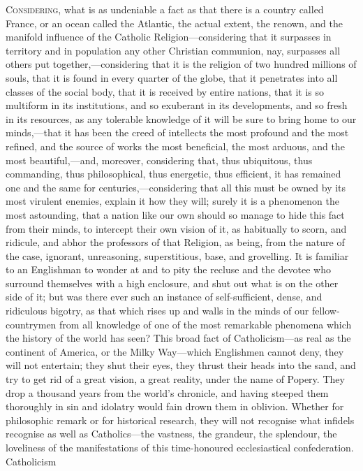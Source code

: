 C\textsc{onsidering}, what is as undeniable a fact as that
there is a country called France, or an ocean called the
Atlantic, the actual extent, the renown, and the manifold
influence of the Catholic Religion—considering that
it surpasses in territory and in population any other
Christian communion, nay, surpasses all others put
together,—considering that it is the religion of two
hundred millions of souls, that it is found in every
quarter of the globe, that it penetrates into all classes
of the social body, that it is received by entire
nations, that it is so multiform in its institutions, and
so exuberant in its developments, and so fresh in its
resources, as any tolerable knowledge of it will be sure
to bring home to our minds,—that it has been the
creed of intellects the most profound and the most
refined, and the source of works the most beneficial, the
most arduous, and the most beautiful,—and, moreover,
considering that, thus ubiquitous, thus commanding, thus
philosophical, thus energetic, thus efficient, it has
remained one and the same for centuries,—considering
that all this must be owned by its most virulent enemies,
explain it how they will; surely it is a phenomenon the
most astounding, that a nation like our own should so
manage to hide this fact from their minds, to intercept
their own vision of it, as habitually to scorn, and
ridicule, and abhor the professors of that Religion, as
being, from the nature of the case, ignorant,
unreasoning, superstitious, base, and grovelling. It is
familiar to an Englishman to wonder at and to pity the
recluse and the devotee who surround themselves with a
high enclosure, and shut out what is on the other side of
it; but was there ever such an instance of
self-sufficient, dense, and ridiculous bigotry, as that
which rises up and walls in the minds of our
fellow-countrymen from all knowledge of one of the most
remarkable phenomena which the history of the world has
seen? This broad fact of Catholicism—as real as the
continent of America, or the Milky Way—which
Englishmen cannot deny, they will not entertain; they
shut their eyes, they thrust their heads into the sand,
and try to get rid of a great vision, a great reality,
under the name of Popery. They drop a thousand years from
the world's chronicle, and having steeped them thoroughly
in sin and idolatry would fain drown them in oblivion.
Whether for philosophic remark or for historical
research, they will not recognise what infidels recognise
as well as Catholics—the vastness, the grandeur, the
splendour, the loveliness of the manifestations of this
time-honoured ecclesiastical confederation. Catholicism
